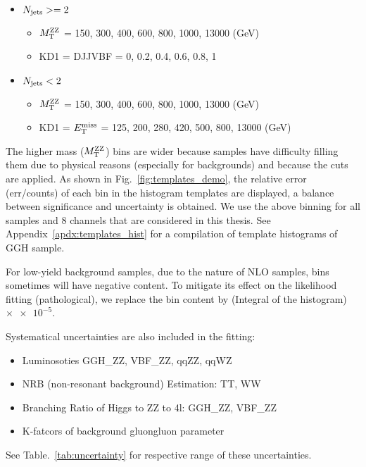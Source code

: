 \begin{itemize} 
    \item $N_\mathrm{jets} >= 2$
        \begin{itemize} 
            \item $M_\mathrm{T}^{\mathrm{ZZ}}$ = 150, 300, 400, 600, 800, 1000, 13000 (GeV)
            \item KD1 = DJJVBF = 0, 0.2, 0.4, 0.6, 0.8, 1
        \end{itemize}
    \item $N_\mathrm{jets} < 2$
        \begin{itemize} 
            \item $M_\mathrm{T}^{\mathrm{ZZ}}$ = 150, 300, 400, 600, 800, 1000, 13000 (GeV)
            \item KD1 = $E_{\mathrm{T}}^{\mathrm{miss}}$ = 125, 200, 280, 420, 500, 800, 13000 (GeV)
        \end{itemize}
\end{itemize}
The higher mass ($M_\mathrm{T}^{\mathrm{ZZ}}$) bins are wider because samples
have difficulty filling them due to physical reasons (especially for backgrounds) 
and because the cuts are applied. As shown in Fig.~\ref{fig:templates_demo}, the relative error (err/counts) of each
bin in the histogram templates are displayed, a balance between significance and uncertainty is
obtained. We use the above binning for all samples and 8 channels that are considered in this
thesis. See Appendix~\ref{apdx:templates_hist} for a compilation of template histograms of GGH sample.

For low-yield background samples, due to the nature of NLO samples, bins sometimes will have negative
content. To mitigate its effect on the likelihood fitting (pathological), we replace the bin content
by (Integral of the histogram) $\times \num{e-5}$.

Systematical uncertainties are also included in the fitting:
\begin{itemize}
    \item Luminosoties GGH\_ZZ, VBF\_ZZ, qqZZ, qqWZ
    \item NRB (non-resonant background) Estimation: TT, WW
    \item Branching Ratio of Higgs to ZZ to 4l: GGH\_ZZ, VBF\_ZZ
    \item K-fatcors of background gluongluon parameter
\end{itemize}
See Table.~\ref{tab:uncertainty} for respective range of these uncertainties.

